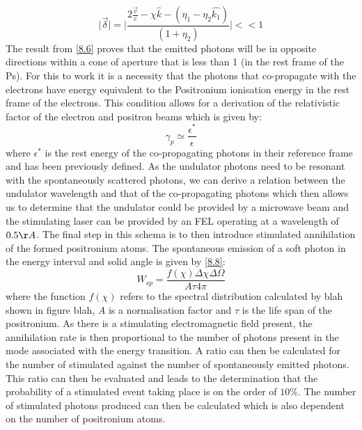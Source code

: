 \begin{equation}
\label{8.6}
\mid \vec{\delta} \mid = \mid \frac{2 \frac{\vec{v}}{c} - \chi \hat{k} - (\eta_1 -\eta_2\hat{k_1})}{(1+\eta_2)} \mid<<1
\end{equation}
The result from \ref{8.6} proves that the emitted photons will be in opposite directions within a cone of aperture that is less than 1 (in the rest frame of the Ps). For this to work it is a necessity that the photons that co-propagate with the electrons have energy equivalent to the Positronium ionisation energy in the rest frame of the electrons. This condition allows for a derivation of the relativistic factor of the electron and positron beams which is given by:
\begin{equation}
\label{8.7}
\gamma_p \simeq \frac{\epsilon^*}{\epsilon}
\end{equation}
where $\epsilon^*$ is the rest energy of the co-propagating photons in their reference frame and has been previously defined. As the undulator photons need to be resonant with the spontaneously scattered photons, we can derive a relation between the undulator wavelength and that of the co-propagating photons which then allows us to determine that the undulator could be provided by a microwave beam and the stimulating laser can be provided by an FEL operating at a wavelength of $0.5\AA$. The final step in this schema is to then introduce stimulated annihilation of the formed positronium atoms. 
\newline
\newline
The spontaneous emission of a soft photon in the energy interval and solid angle is given by \ref{8.8}:
\begin{equation}
\label{8.8}
W_{sp} = \frac{f(\chi)\Delta\chi\Delta\Omega}{A \tau 4 \pi}
\end{equation}
where the function $f(\chi)$ refers to the spectral distribution calculated by blah shown in figure blah, $A$ is a normalisation factor and $\tau$ is the life span of the positronium. As there is a stimulating electromagnetic field present, the annihilation rate is then proportional to the number of photons present in the mode associated with the energy transition. A ratio can then be calculated for the number of stimulated against the number of spontaneously emitted photons. This ratio can then be evaluated and leads to the determination that the probability of a stimulated event taking place is on the order of $10\%$. The number of stimulated photons produced can then be calculated which is also dependent on the number of positronium atoms. 
